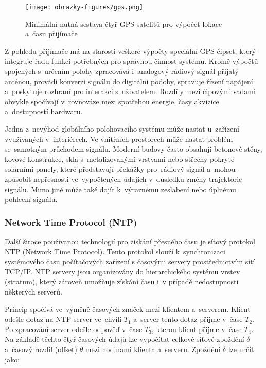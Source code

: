 \begin{figure}[h]
    \centering
    \texttt{[image: obrazky-figures/gps.png]}
    
    \caption{Minimální nutná sestava čtyř GPS satelitů pro výpočet lokace a~času přijímače~\cite{time_theory_gps}}
    \label{fig:low-power-modes}
\end{figure}

Z pohledu přijímače má na starosti veškeré výpočty speciální GPS čipset, který integruje řadu funkcí potřebných pro správnou činnost systému. Kromě výpočtů spojených s~určením polohy zpracovává i~analogový rádiový signál přijatý anténou, provádí konverzi signálu do digitální podoby, spravuje řízení napájení a~poskytuje rozhraní pro interakci s~uživatelem. Rozdíly mezi čipovými sadami obvykle spočívají v~rovnováze mezi spotřebou energie, časy akvizice a~dostupností hardwaru.~\cite{sparkfun_gps}

Jedna z~nevýhod globálního polohovacího systému může nastat u~zařízení využívaných v~interiérech. Ve vnitřních prostorech může nastat problém se~samotným průchodem signálu. Moderní budovy často obsahují betonové stěny, kovové konstrukce, skla s~metalizovanými vrstvami nebo střechy pokryté solárními panely, které představují překážky pro~rádiový signál a~mohou způsobit nepřesnosti ve~vypočtených údajích v~důsledku změny trajektorie signálu. Mimo jiné může také dojít k~výraznému zeslabení nebo úplnému pohlcení signálu.~\cite{sparkfun_gps}


\subsubsection{Network Time Protocol (NTP)}
Další široce používanou technologií pro získání přesného času je síťový protokol NTP (Network Time Protocol). Tento protokol slouží k~synchronizaci systémového času počítačových zařízení s časovými servery prostřednictvím sítí TCP/IP. NTP servery jsou organizovány do hierarchického systému vrstev (stratum), který zároveň umožňuje získání času i~v případě nedostupnosti některých serverů.

Princip spočívá ve~výměně časových značek mezi klientem a~serverem. Klient odešle dotaz na NTP server ve~chvíli $T_1$ a~server tento dotaz přijme v~čase $T_2$. Po zpracování server odešle odpověď v~čase $T_3$, kterou klient přijme v~čase $T_4$. Na základě těchto čtyř časových údajů lze vypočítat celkové síťové zpoždění $\delta$ a~časový rozdíl (offset) $\theta$ mezi hodinami klienta a~serveru. Zpoždění $\delta$ lze určit jako:

